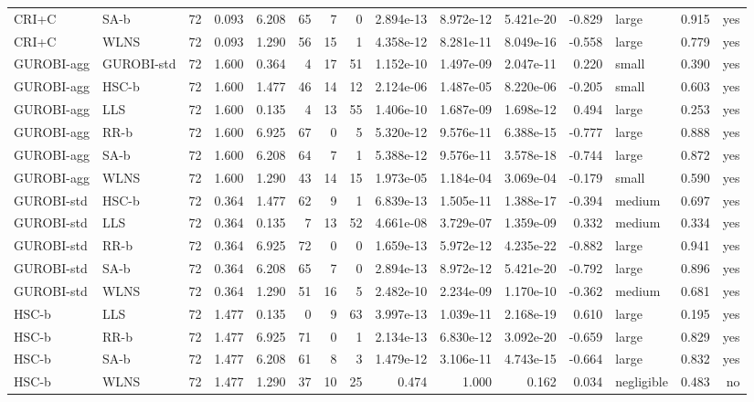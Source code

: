 \begin{table}[htbp]
\begin{tabular}{llrrrrrrrrrrlrr}
CRI+C & SA-b & 72 & 0.093 & 6.208 & 65 & 7 & 0 & 2.894e-13 & 8.972e-12 & 5.421e-20 & -0.829 & large & 0.915 & yes \\
CRI+C & WLNS & 72 & 0.093 & 1.290 & 56 & 15 & 1 & 4.358e-12 & 8.281e-11 & 8.049e-16 & -0.558 & large & 0.779 & yes \\
GUROBI-agg & GUROBI-std & 72 & 1.600 & 0.364 & 4 & 17 & 51 & 1.152e-10 & 1.497e-09 & 2.047e-11 & 0.220 & small & 0.390 & yes \\
GUROBI-agg & HSC-b & 72 & 1.600 & 1.477 & 46 & 14 & 12 & 2.124e-06 & 1.487e-05 & 8.220e-06 & -0.205 & small & 0.603 & yes \\
GUROBI-agg & LLS & 72 & 1.600 & 0.135 & 4 & 13 & 55 & 1.406e-10 & 1.687e-09 & 1.698e-12 & 0.494 & large & 0.253 & yes \\
GUROBI-agg & RR-b & 72 & 1.600 & 6.925 & 67 & 0 & 5 & 5.320e-12 & 9.576e-11 & 6.388e-15 & -0.777 & large & 0.888 & yes \\
GUROBI-agg & SA-b & 72 & 1.600 & 6.208 & 64 & 7 & 1 & 5.388e-12 & 9.576e-11 & 3.578e-18 & -0.744 & large & 0.872 & yes \\
GUROBI-agg & WLNS & 72 & 1.600 & 1.290 & 43 & 14 & 15 & 1.973e-05 & 1.184e-04 & 3.069e-04 & -0.179 & small & 0.590 & yes \\
GUROBI-std & HSC-b & 72 & 0.364 & 1.477 & 62 & 9 & 1 & 6.839e-13 & 1.505e-11 & 1.388e-17 & -0.394 & medium & 0.697 & yes \\
GUROBI-std & LLS & 72 & 0.364 & 0.135 & 7 & 13 & 52 & 4.661e-08 & 3.729e-07 & 1.359e-09 & 0.332 & medium & 0.334 & yes \\
GUROBI-std & RR-b & 72 & 0.364 & 6.925 & 72 & 0 & 0 & 1.659e-13 & 5.972e-12 & 4.235e-22 & -0.882 & large & 0.941 & yes \\
GUROBI-std & SA-b & 72 & 0.364 & 6.208 & 65 & 7 & 0 & 2.894e-13 & 8.972e-12 & 5.421e-20 & -0.792 & large & 0.896 & yes \\
GUROBI-std & WLNS & 72 & 0.364 & 1.290 & 51 & 16 & 5 & 2.482e-10 & 2.234e-09 & 1.170e-10 & -0.362 & medium & 0.681 & yes \\
HSC-b & LLS & 72 & 1.477 & 0.135 & 0 & 9 & 63 & 3.997e-13 & 1.039e-11 & 2.168e-19 & 0.610 & large & 0.195 & yes \\
HSC-b & RR-b & 72 & 1.477 & 6.925 & 71 & 0 & 1 & 2.134e-13 & 6.830e-12 & 3.092e-20 & -0.659 & large & 0.829 & yes \\
HSC-b & SA-b & 72 & 1.477 & 6.208 & 61 & 8 & 3 & 1.479e-12 & 3.106e-11 & 4.743e-15 & -0.664 & large & 0.832 & yes \\
HSC-b & WLNS & 72 & 1.477 & 1.290 & 37 & 10 & 25 & 0.474 & 1.000 & 0.162 & 0.034 & negligible & 0.483 & no \\

\end{tabular}
\end{table}

